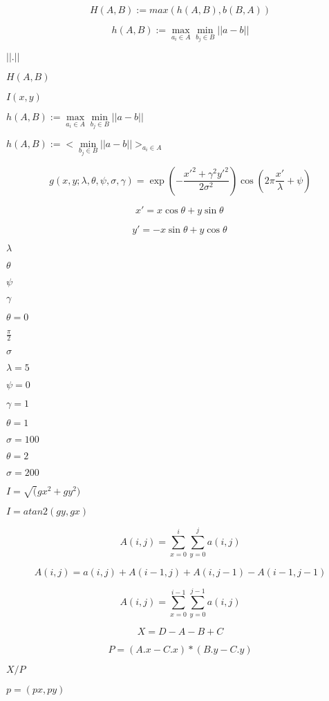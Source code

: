 \documentclass{article}
\begin{document}
\[ H(A,B) := max ( h(A,B), b(B,A) ) \]
\pagebreak

\[ h(A,B) := \max\limits_{a_i \in A} \min\limits_{b_j \in B} || a - b || \]
\pagebreak

$ || . || $
\pagebreak

$H(A,B)$
\pagebreak

$I(x,y)$
\pagebreak

$h(A,B) := \max\limits_{a_i \in A} \min\limits_{b_j \in B} || a - b || $
\pagebreak

$h(A,B) := < \min\limits_{b_j \in B} || a - b || >_{a_i \in A} $
\pagebreak

\[ g(x,y;\lambda,\theta,\psi,\sigma,\gamma)=\exp(-\frac{x'^2+\gamma^2y'^2}{2\sigma^2})\cos(2\pi\frac{x'}{\lambda}+\psi) \]
\pagebreak

\[ x' = x \cos\theta + y \sin\theta\, \]
\pagebreak

\[ y' = -x \sin\theta + y \cos\theta\, \]
\pagebreak

$\lambda$
\pagebreak

$\theta$
\pagebreak

$\psi$
\pagebreak

$\gamma$
\pagebreak

$\theta=0$
\pagebreak

$\frac{\pi}{2}$
\pagebreak

$\sigma$
\pagebreak

$\lambda=5$
\pagebreak

$\psi=0$
\pagebreak

$\gamma=1$
\pagebreak

$\theta=1$
\pagebreak

$\sigma=100$
\pagebreak

$\theta=2$
\pagebreak

$\sigma=200$
\pagebreak

$ I=\sqrt(gx^2+gy^2) $
\pagebreak

$ I=atan2(gy,gx) $
\pagebreak

\[ A(i,j) = \sum\limits_{x=0}^i \sum\limits_{y=0}^j a(i,j) \]
\pagebreak

\[ A(i,j) = a(i,j)+A(i-1,j)+A(i,j-1)-A(i-1,j-1) \]
\pagebreak

\[ A(i,j) = \sum\limits_{x=0}^{i-1} \sum\limits_{y=0}^{j-1} a(i,j) \]
\pagebreak

\[X = D - A - B + C\]
\pagebreak

\[P = (A.x-C.x) * (B.y-C.y) \]
\pagebreak

$X/P$
\pagebreak

$p=(px,py)$
\pagebreak
\end{document}
